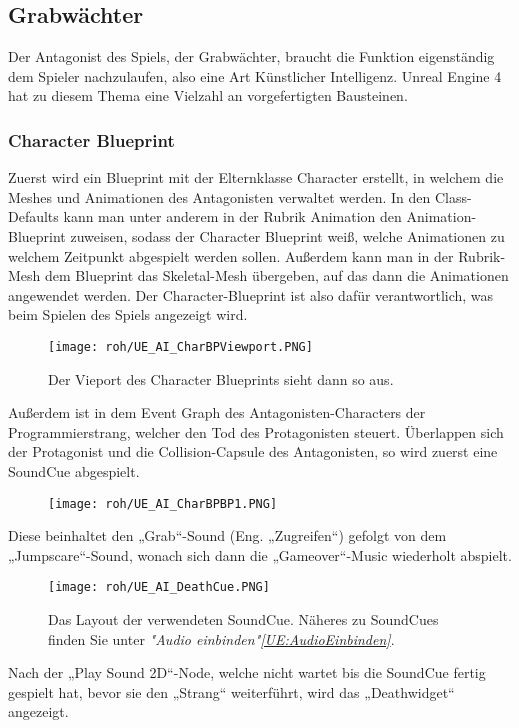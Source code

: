 \subsection{Grabwächter}
Der Antagonist des Spiels, der Grabwächter, braucht die Funktion eigenständig dem Spieler nachzulaufen, also eine Art Künstlicher Intelligenz. Unreal Engine 4 hat zu diesem Thema eine Vielzahl an vorgefertigten Bausteinen.
\subsubsection{Character Blueprint}
Zuerst wird ein Blueprint mit der Elternklasse Character erstellt, in welchem die Meshes und Animationen des Antagonisten verwaltet werden. In den Class-Defaults kann man unter anderem in der Rubrik Animation den Animation-Blueprint zuweisen, sodass der Character Blueprint weiß, welche Animationen zu welchem Zeitpunkt abgespielt werden sollen. Außerdem kann man in der Rubrik-Mesh dem Blueprint das Skeletal-Mesh übergeben, auf das dann die Animationen angewendet werden. Der Character-Blueprint ist also dafür verantwortlich, was beim Spielen des Spiels angezeigt wird.
\begin{figure}[H]
    \centering
    \texttt{[image: roh/UE\_AI\_CharBPViewport.PNG]}
    \caption{Der Vieport des Character Blueprints sieht dann so aus.}
    \label{UE:AI_CharBPViewport}
\end{figure}
Außerdem ist in dem Event Graph des Antagonisten-Characters der Programmierstrang, welcher den Tod des Protagonisten steuert. Überlappen sich der Protagonist und die Collision-Capsule des Antagonisten, so wird zuerst eine SoundCue abgespielt.
\begin{figure}[H]
    \centering
    \texttt{[image: roh/UE\_AI\_CharBPBP1.PNG]}
    \label{UE:AI_CharBPBP1}
\end{figure}
Diese beinhaltet den „Grab“-Sound (Eng. „Zugreifen“) gefolgt von dem „Jumpscare“-Sound, wonach sich dann die „Gameover“-Music wiederholt abspielt.
\begin{figure}[H]
    \centering
    \texttt{[image: roh/UE\_AI\_DeathCue.PNG]}
    \caption{Das Layout der verwendeten SoundCue. Näheres zu SoundCues finden Sie unter \textit{"Audio einbinden"\ref{UE:AudioEinbinden}}.}
    \label{UE:AI_DeathCue}
\end{figure}
Nach der „Play Sound 2D“-Node, welche nicht wartet bis die SoundCue fertig gespielt hat, bevor sie den „Strang“ weiterführt, wird das „Deathwidget“ angezeigt.
